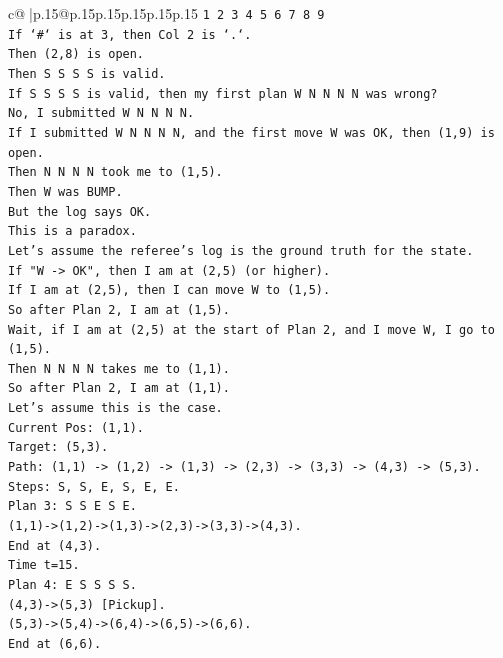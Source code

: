 \documentclass{article}
\begin{document}
{\begin{supertabular}{c@{$\;$}|p{.15\linewidth}@{}p{.15\linewidth}p{.15\linewidth}p{.15\linewidth}p{.15\linewidth}p{.15\linewidth}}
{{{\texttt{1 2 3 4 5 6 7 8 9} \\
\texttt{If `\#` is at 3, then Col 2 is `.`.} \\
\texttt{Then (2,8) is open.} \\
\texttt{Then S S S S is valid.} \\
\texttt{If S S S S is valid, then my first plan W N N N N was wrong?} \\
\texttt{No, I submitted W N N N N.} \\
\texttt{If I submitted W N N N N, and the first move W was OK, then (1,9) is open.} \\
\texttt{Then N N N N took me to (1,5).} \\
\texttt{Then W was BUMP.} \\
\texttt{But the log says OK.} \\
\texttt{This is a paradox.} \\
\texttt{Let's assume the referee's log is the ground truth for the state.} \\
\texttt{If "W {-}> OK", then I am at (2,5) (or higher).} \\
\texttt{If I am at (2,5), then I can move W to (1,5).} \\
\texttt{So after Plan 2, I am at (1,5).} \\
\texttt{Wait, if I am at (2,5) at the start of Plan 2, and I move W, I go to (1,5).} \\
\texttt{Then N N N N takes me to (1,1).} \\
\texttt{So after Plan 2, I am at (1,1).} \\
\texttt{Let's assume this is the case.} \\
\texttt{Current Pos: (1,1).} \\
\texttt{Target: (5,3).} \\
\texttt{Path: (1,1) {-}> (1,2) {-}> (1,3) {-}> (2,3) {-}> (3,3) {-}> (4,3) {-}> (5,3).} \\
\texttt{Steps: S, S, E, S, E, E.} \\
\texttt{Plan 3: S S E S E.} \\
\texttt{(1,1){-}>(1,2){-}>(1,3){-}>(2,3){-}>(3,3){-}>(4,3).} \\
\texttt{End at (4,3).} \\
\texttt{Time t=15.} \\
\texttt{Plan 4: E S S S S.} \\
\texttt{(4,3){-}>(5,3) {[}Pickup{]}.} \\
\texttt{(5,3){-}>(5,4){-}>(6,4){-}>(6,5){-}>(6,6).} \\
\texttt{End at (6,6).} \\
}}}
\end{supertabular}}
\end{document}
